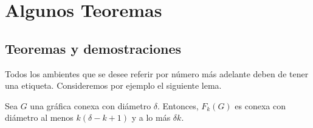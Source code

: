 \chapter{Algunos Teoremas}%
\label{cap:ejemplos}

\section{Teoremas y demostraciones}%
\label{sec:etiquetas}

Todos los ambientes que se desee referir por n\'umero m\'as adelante deben de
tener una etiqueta.  Consideremos por ejemplo el siguiente lema.


\begin{teorema}%
\label{teo:primero}
Sea $G$ una gr\'afica conexa con di\'ametro $\delta$. Entonces, $F_{k}(G)$ es 
conexa con di\'ametro al menos $k(\delta -k+1)$ y a lo m\'as $\delta k$.
\end{teorema}

